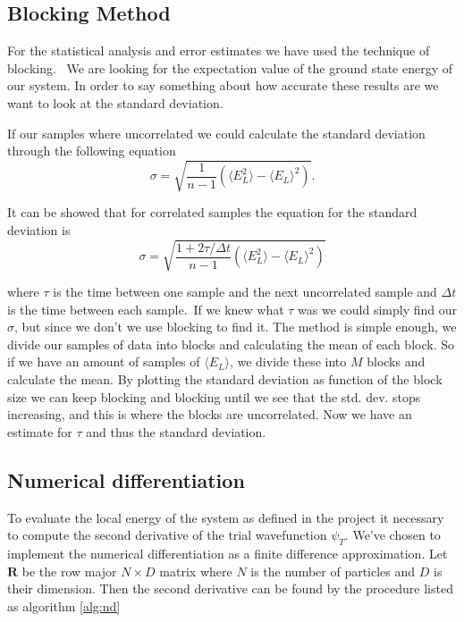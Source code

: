 \subsection{Blocking Method}

For the statistical analysis and error estimates we have used the technique of blocking. \
We are looking for the expectation value of the ground state energy of our system. In order to say something about how accurate these results are we want to look at the standard deviation. 

If our samples where uncorrelated we could calculate the standard deviation through the following equation 
$$\sigma = \sqrt{\frac{1}{n - 1} \left(\langle E_L^2\rangle - \langle E_L \rangle^2\right)}.$$

It can be showed that for correlated samples the equation for the standard deviation is
$$\sigma = \sqrt{\frac{1 + 2 \tau / \Delta t}{n - 1} \left(\langle E_L^2\rangle - \langle E_L \rangle^2\right)}$$

where $\tau$ is the time between one sample and the next uncorrelated sample and $\Delta t$ is the time between each sample.\
If we knew what $\tau$ was we could simply find our $\sigma$, but since we don't we use blocking to find it. The method is simple enough, we divide our samples of data into blocks and calculating the mean of each block. So if we have an amount of samples of $\langle E_L \rangle$, we divide these into $M$ blocks and calculate the mean. By plotting the standard deviation as function of the block size we can keep blocking and blocking until we see that the std. dev. stops increasing, and this is where the blocks are uncorrelated. Now we have an estimate for $\tau$ and thus the standard deviation.


\subsection{Numerical differentiation}
To evaluate the local energy of the system as defined in the project it necessary to compute the second derivative of the trial wavefunction $\psi_T$. We've chosen to implement the numerical differentiation as a finite difference approximation. Let $\mathbf{R}$ be the row major $N \times D$ matrix where $N$ is the number of particles and $D$ is their dimension. Then the second derivative can be found by the procedure listed as algorithm \ref{alg:nd}

